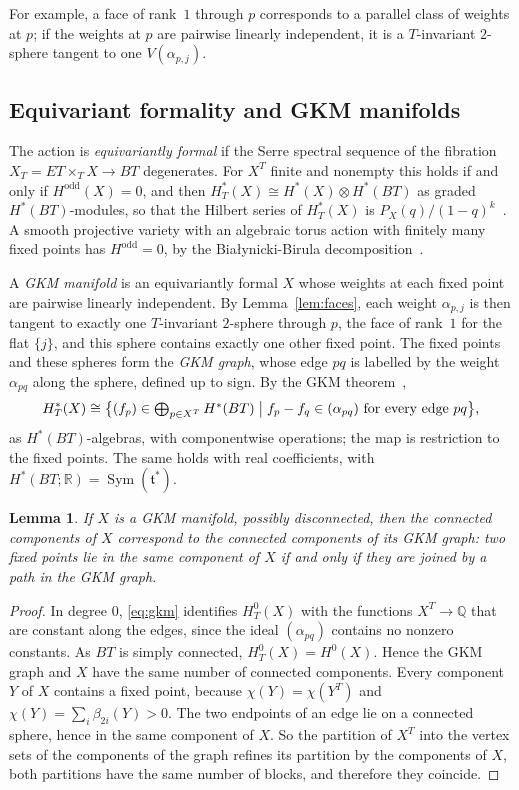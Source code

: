 \documentclass[11pt,a4paper]{article}
\numberwithin{equation}{section}
\theoremstyle{plain}
\newtheorem{lemma}[theorem]{Lemma}
\theoremstyle{definition}
\theoremstyle{remark}
\newcommand{\Q}{\mathbb{Q}}
\newcommand{\R}{\mathbb{R}}
\newcommand{\HT}{H^{*}_{T}}
\DeclareMathOperator{\Sym}{Sym}
\begin{document}
For example, a face of rank~$1$ through $p$ corresponds to a parallel class of weights at $p$; if the weights at $p$ are pairwise linearly independent, it is a $T$-invariant $2$-sphere tangent to one $V(\alpha_{p,j})$.

\subsection{Equivariant formality and GKM manifolds}
The action is \emph{equivariantly formal} if the Serre spectral sequence of the fibration $X_T=ET\times_TX\to BT$ degenerates. For $X^T$ finite and nonempty this holds if and only if $H^{\mathrm{odd}}(X)=0$, and then $\HT(X)\cong H^*(X)\otimes H^*(BT)$ as graded $H^*(BT)$-modules, so that the Hilbert series of $\HT(X)$ is $P_X(q)/(1-q)^k$~\cite{GKM98}. A smooth projective variety with an algebraic torus action with finitely many fixed points has $H^{\mathrm{odd}}=0$, by the Białynicki-Birula decomposition~\cite{BB73}.

A \emph{GKM manifold} is an equivariantly formal $X$ whose weights at each fixed point are pairwise linearly independent. By Lemma~\ref{lem:faces}, each weight $\alpha_{p,j}$ is then tangent to exactly one $T$-invariant $2$-sphere through $p$, the face of rank~$1$ for the flat $\{j\}$, and this sphere contains exactly one other fixed point. The fixed points and these spheres form the \emph{GKM graph}, whose edge $pq$ is labelled by the weight $\alpha_{pq}$ along the sphere, defined up to sign. By the GKM theorem~\cite{GKM98,CS74},
\begin{equation}\label{eq:gkm}
\HT(X)\cong\bigl\{(f_p)\in\textstyle\bigoplus_{p\in X^T}H^*(BT)\bigm| f_p-f_q\in(\alpha_{pq})\text{ for every edge }pq\bigr\},
\end{equation}
as $H^*(BT)$-algebras, with componentwise operations; the map is restriction to the fixed points. The same holds with real coefficients, with $H^*(BT;\R)=\Sym(\mathfrak t^*)$.

\begin{lemma}\label{lem:gkm-components}
If $X$ is a GKM manifold, possibly disconnected, then the connected components of $X$ correspond to the connected components of its GKM graph: two fixed points lie in the same component of $X$ if and only if they are joined by a path in the GKM graph.
\end{lemma}

\begin{proof}
In degree $0$, \eqref{eq:gkm} identifies $H^0_T(X)$ with the functions $X^T\to\Q$ that are constant along the edges, since the ideal $(\alpha_{pq})$ contains no nonzero constants. As $BT$ is simply connected, $H^0_T(X)=H^0(X)$. Hence the GKM graph and $X$ have the same number of connected components. Every component $Y$ of $X$ contains a fixed point, because $\chi(Y)=\chi(Y^T)$ and $\chi(Y)=\sum_i\beta_{2i}(Y)>0$. The two endpoints of an edge lie on a connected sphere, hence in the same component of $X$. So the partition of $X^T$ into the vertex sets of the components of the graph refines its partition by the components of $X$, both partitions have the same number of blocks, and therefore they coincide.
\end{proof}
\end{document}

